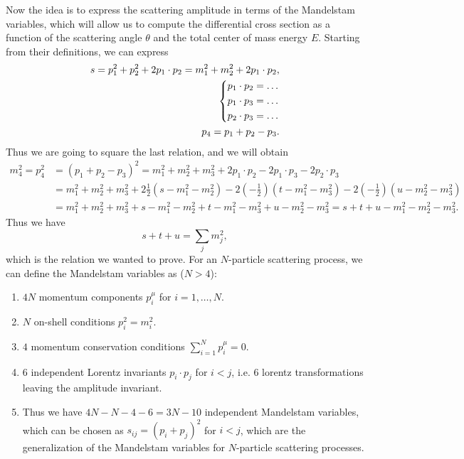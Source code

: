 Now the idea is to express the scattering amplitude in terms of the Mandelstam variables, which will allow us to compute the differential cross section as a function of the scattering angle \(\theta\) and the total center of mass energy \(E\). Starting from their definitions, we can express
\[
    \begin{aligned}
        s = p_1^2 + p_2^2 + 2 p_1 \cdot p_2 = m_1^2 + m_2^2 + 2 p_1 \cdot p_2, \\
        \begin{dcases}
            p_1 \cdot p_2 = \dots \\
            p_1 \cdot p_3 = \dots \\
            p_2 \cdot p_3 = \dots
        \end{dcases}                                                  \\
        p_4 = p_1 + p_2 - p_3.
    \end{aligned}
\]
Thus we are going to square the last relation, and we will obtain
\[
    \begin{aligned}
        m_4^2 = p_4^2 & = (p_1 + p_2 - p_3)^2 = m_1^2 + m_2^2 + m_3^2 + 2 p_1 \cdot p_2 - 2 p_1 \cdot p_3 - 2 p_2 \cdot p_3                                                                                                     \\
                      & = m_1^2 + m_2^2 + m_3^2 + 2 \tfrac{1}{2}\left( s - m_1^2 - m_2^2 \right) - 2 \left(-\tfrac{1}{2}\right)\left( t - m_1^2 - m_3^2 \right) - 2 \left(- \tfrac{1}{2}\right)\left( u - m_2^2 - m_3^2 \right) \\
                      & = m_1^2 + m_2^2 + m_3^2 + s - m_1^2 - m_2^2 + t - m_1^2 - m_3^2 + u - m_2^2 - m_3^2 = s + t + u - m_1^2 - m_2^2 - m_3^2.
    \end{aligned}
\]
Thus we have
\[
    s + t + u = \sum_{j} m_j^2,
\]
which is the relation we wanted to prove. For an \(N\)-particle scattering process, we can define the Mandelstam variables as (\(N>4\)):
\begin{enumerate}
    \item \(4N\) momentum components \(p_i^\mu\) for \(i = 1, \dots, N\).
    \item \(N\) on-shell conditions \(p_i^2 = m_i^2\).
    \item \(4\) momentum conservation conditions \(\sum_{i=1}^N p_i^\mu = 0\).
    \item 6 independent Lorentz invariants \(p_i \cdot p_j\) for \(i < j\), i.e. 6 lorentz transformations leaving the amplitude invariant.
    \item Thus we have \(4N - N - 4 - 6 = 3N - 10\) independent Mandelstam variables, which can be chosen as \(s_{ij} = (p_i + p_j)^2\) for \(i < j\), which are the generalization of the Mandelstam variables for \(N\)-particle scattering processes.
\end{enumerate}

